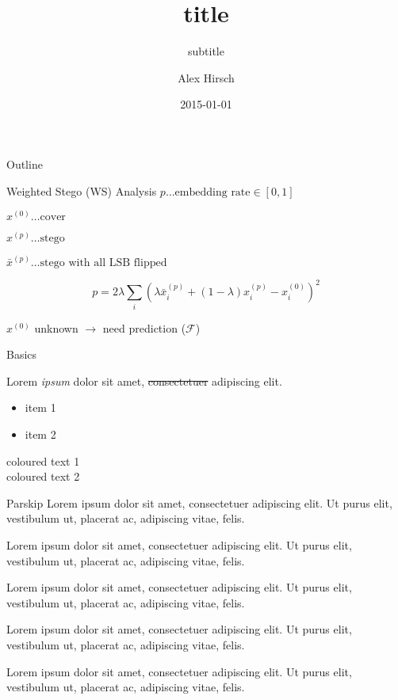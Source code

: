 \documentclass[beamer]{uibk}
\title{title}
\subtitle{subtitle}
\author{Alex Hirsch}
\date{2015-01-01}
\begin{document}
\maketitle

\begin{frame}{Outline}
    \tableofcontents
\end{frame}

\begin{frame}{Weighted Stego (WS) Analysis}
    $ p \dots \text{embedding rate} \in [0,1] $

    $ x^{(0)} \dots \text{cover} $

    $ x^{(p)} \dots \text{stego} $

    $ \bar{x}^{(p)} \dots \text{stego with all LSB flipped} $

    \[ p = 2 \lambda \sum_i \left(\lambda\bar{x}_i^{(p)} + (1 - \lambda) x_i^{(p)} - x_i^{(0)}\right)^2 \]

    $x^{(0)}$ unknown $\to$ need prediction ($\mathcal{F}$)
\end{frame}

\begin{frame}{Basics}

    Lorem \emph{ipsum} dolor \alert{sit} amet, \st{consectetuer} adipiscing
    elit\footnotemark.


    \begin{itemize}
        \item<1-> item 1
        \item<2-> item 2
    \end{itemize}

    \color{uibkorange} coloured text 1 \\
    \color{uibkgreen}  coloured text 2

\end{frame}

\begin{frame}{Parskip}
    Lorem ipsum dolor sit amet, consectetuer adipiscing elit. Ut purus elit,
    vestibulum ut, placerat ac, adipiscing vitae, felis.

    Lorem ipsum dolor sit amet, consectetuer adipiscing elit. Ut purus elit,
    vestibulum ut, placerat ac, adipiscing vitae, felis.

    \smallskip
    Lorem ipsum dolor sit amet, consectetuer adipiscing elit. Ut purus elit,
    vestibulum ut, placerat ac, adipiscing vitae, felis.

    \medskip
    Lorem ipsum dolor sit amet, consectetuer adipiscing elit. Ut purus elit,
    vestibulum ut, placerat ac, adipiscing vitae, felis.

    \bigskip
    Lorem ipsum dolor sit amet, consectetuer adipiscing elit. Ut purus elit,
    vestibulum ut, placerat ac, adipiscing vitae, felis.
\end{frame}
\end{document}
